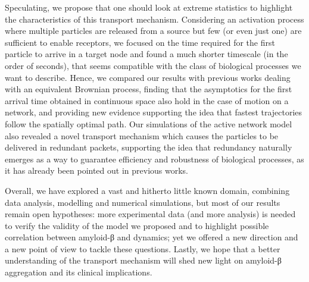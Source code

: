Speculating, we propose that one should look at extreme statistics to highlight the characteristics of this transport mechanism.
Considering an activation process where multiple particles are released from a source but few (or even just one) are sufficient to enable receptors, we focused on the time required for the first particle to arrive in a target node and found a much shorter timescale (in the order of seconds), that seems compatible with the class of biological processes we want to describe.
Hence, we compared our results with previous works dealing with an equivalent Brownian process, finding that the asymptotics for the first arrival time obtained in continuous space also hold in the case of motion on a network, and providing new evidence supporting the idea that fastest trajectories follow the spatially optimal path.
Our simulations of the active network model also revealed a novel transport mechanism which causes the particles to be delivered in redundant packets, supporting the idea that redundancy naturally emerges as a way to guarantee efficiency and robustness of biological processes, as it has already been pointed out in previous works.

Overall, we have explored a vast and hitherto little known domain, combining data analysis, modelling and numerical simulations, but most of our results remain open hypotheses: more experimental data (and more analysis) is needed to verify the validity of the  model we proposed and to highlight possible correlation between amyloid-β and  dynamics; yet we offered a new direction and a new point of view to tackle these questions. Lastly, we hope that a better understanding of the  transport mechanism will shed new light on amyloid-β aggregation and its clinical implications.
